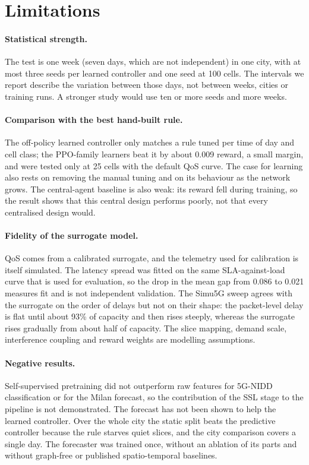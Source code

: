 \section{Limitations}
\label{sec:limitations}
\paragraph{Statistical strength.}
The test is one week (seven days, which are not independent) in one city, with at most three seeds per learned controller and one seed at 100 cells. The intervals we report describe the variation between those days, not between weeks, cities or training runs. A stronger study would use ten or more seeds and more weeks.

\paragraph{Comparison with the best hand-built rule.}
The off-policy learned controller only matches a rule tuned per time of day and cell class; the PPO-family learners beat it by about 0.009 reward, a small margin, and were tested only at 25 cells with the default QoS curve. The case for learning also rests on removing the manual tuning and on its behaviour as the network grows. The central-agent baseline is also weak: its reward fell during training, so the result shows that this central design performs poorly, not that every centralised design would.

\paragraph{Fidelity of the surrogate model.}
QoS comes from a calibrated surrogate, and the telemetry used for calibration is itself simulated. The latency spread was fitted on the same SLA-against-load curve that is used for evaluation, so the drop in the mean gap from 0.086 to 0.021 measures fit and is not independent validation. The Simu5G sweep agrees with the surrogate on the order of delays but not on their shape: the packet-level delay is flat until about 93\% of capacity and then rises steeply, whereas the surrogate rises gradually from about half of capacity. The slice mapping, demand scale, interference coupling and reward weights are modelling assumptions.

\paragraph{Negative results.}
Self-supervised pretraining did not outperform raw features for 5G-NIDD classification or for the Milan forecast, so the contribution of the SSL stage to the pipeline is not demonstrated. The forecast has not been shown to help the learned controller. Over the whole city the static split beats the predictive controller because the rule starves quiet slices, and the city comparison covers a single day. The forecaster was trained once, without an ablation of its parts and without graph-free or published spatio-temporal baselines.

